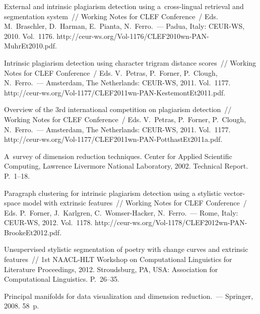 \begin{multicols}{2}
{{\begin{thebibliography}{99}
  External and intrinsic plagiarism detection using a~cross-lingual retrieval 
  and segmentation system~// Working Notes for CLEF Conference~/ Eds. M.~Braschler, 
  D.~Harman, E.~Pianta, N.~Ferro.~--- Padua, Italy: CEUR-WS, 2010. 
  Vol.~1176. 
  {\sf http://ceur-ws.org/Vol-1176/CLEF2010wn-PAN-MuhrEt2010.pdf}. 



  Intrinsic plagiarism detection using character trigram distance scores~// 
 Working Notes for CLEF Conference~/ Eds. V.~Petras, P.~Forner, P.~Clough, N.~Ferro.~--- 
 Amsterdam, The Netherlands: CEUR-WS, 2011. Vol.~1177. 
 {\sf http://ceur-ws.org/Vol-1177/CLEF2011wn-PAN-KestemontEt2011.pdf}. 


Overview of the 3rd international competition on plagiarism detection~// 
Working Notes for CLEF Conference~/ Eds. V.~Petras, P.~Forner, P.~Clough, N.~Ferro.~--- 
Amsterdam, The Netherlands: CEUR-WS, 2011. Vol.~1177. 
{\sf http://ceur-ws.org/Vol-1177/CLEF2011wn-PAN-PotthastEt2011a.pdf}. 



  {A~survey of dimension reduction techniques}. 
 Center for Applied Scientific Computing, Lawrence Livermore National Laboratory, 
 2002. Technical Report. P.~1--18.

   Paragraph clustering for intrinsic plagiarism 
  detection using a stylistic vector-space model with extrinsic features~// 
  Working Notes for CLEF Conference~/ Eds. P.~Forner, J.~Karlgren, C.~Womser-Hacker, 
  N.~Ferro.~--- Rome, Italy: CEUR-WS, 2012. Vol.~1178. 
  {\sf http://ceur-ws.org/Vol-1178/CLEF2012wn-PAN-BrookeEt2012.pdf}. 


  Unsupervised stylistic segmentation of poetry with change curves and extrinsic 
  features~// 1st NAACL-HLT Workshop on Computational Linguistics for Literature
  Proceedings, 2012. Stroudsburg, PA, USA: Association for Computational Linguistics.
  P.~26--35.

   Principal manifolds for data visualization and dimension 
  reduction.~--- Springer, 2008. 58~p.


\end{thebibliography}}}
\end{multicols}
